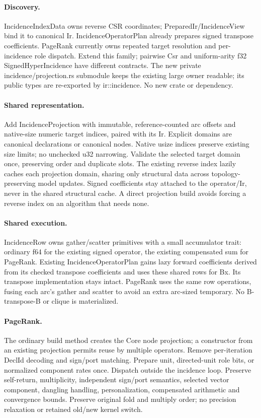 \documentclass[11pt]{article}
\begin{document}
\paragraph{Discovery.} IncidenceIndexData owns reverse CSR coordinates;
PreparedIr/IncidenceView bind it to canonical Ir. IncidenceOperatorPlan already
prepares signed transpose coefficients. PageRank currently owns repeated target
resolution and per-incidence role dispatch. Extend this family; pairwise Csr and
uniform-arity f32 SignedHyperIncidence have different contracts. The new private
incidence/projection.rs submodule keeps the existing large owner readable; its
public types are re-exported by ir::incidence. No new crate or dependency.
\paragraph{Shared representation.} Add IncidenceProjection with immutable,
reference-counted arc offsets and native-size numeric target indices, paired
with its Ir. Explicit domains are canonical declarations or canonical nodes.
Native usize indices preserve existing size limits; no unchecked u32 narrowing.
Validate the selected target domain once, preserving order and duplicate slots.
The existing reverse index lazily caches each projection domain, sharing only
structural data across topology-preserving model updates. Signed coefficients
stay attached to the operator/Ir, never in the shared structural cache. A direct
projection build avoids forcing a reverse index on an algorithm that needs none.
\paragraph{Shared execution.} IncidenceRow owns gather/scatter primitives with a
small accumulator trait: ordinary f64 for the existing signed operator, the
existing compensated sum for PageRank. Existing IncidenceOperatorPlan gains
lazy forward coefficients derived from its checked transpose coefficients and
uses these shared rows for Bx. Its transpose implementation stays intact.
PageRank uses the same row operations, fusing each arc's gather and scatter to
avoid an extra arc-sized temporary. No B-transpose-B or clique is materialized.
\paragraph{PageRank.} The ordinary build method creates the Core node projection;
a constructor from an existing projection permits reuse by multiple operators.
Remove per-iteration DeclId decoding and sign/port matching. Prepare unit,
directed-unit role bits, or normalized component rates once. Dispatch outside
the incidence loop. Preserve self-return, multiplicity, independent sign/port
semantics, selected vector component, dangling handling, personalization,
compensated arithmetic and convergence bounds. Preserve original fold and multiply
order; no precision relaxation or retained old/new kernel switch.
\end{document}
